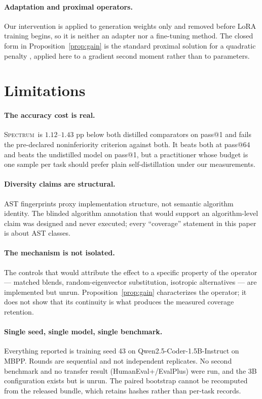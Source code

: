 \documentclass{article}
\newcommand{\method}{\textsc{Spectrum}}
\begin{document}
\paragraph{Adaptation and proximal operators.} Our intervention is applied to generation weights only and removed before LoRA \citep{hu2022lora} training begins, so it is neither an adapter nor a fine-tuning method. The closed form in Proposition~\ref{prop:gain} is the standard proximal solution for a quadratic penalty \citep{parikh2014proximal}, applied here to a gradient second moment rather than to parameters.

\section{Limitations}
\label{sec:limits}

\paragraph{The accuracy cost is real.} \method\ is $1.12$--$1.43$ pp below both distilled comparators on pass@1 and fails the pre-declared noninferiority criterion against both. It beats both at pass@$64$ and beats the undistilled model on pass@1, but a practitioner whose budget is one sample per task should prefer plain self-distillation under our measurements.

\paragraph{Diversity claims are structural.} AST fingerprints proxy implementation structure, not semantic algorithm identity. The blinded algorithm annotation that would support an algorithm-level claim was designed and never executed; every ``coverage'' statement in this paper is about AST classes.

\paragraph{The mechanism is not isolated.} The controls that would attribute the effect to a specific property of the operator --- matched blends, random-eigenvector substitution, isotropic alternatives --- are implemented but unrun. Proposition~\ref{prop:gain} characterizes the operator; it does not show that its continuity is what produces the measured coverage retention.

\paragraph{Single seed, single model, single benchmark.} Everything reported is training seed 43 on Qwen2.5-Coder-1.5B-Instruct on MBPP. Rounds are sequential and not independent replicates. No second benchmark and no transfer result (HumanEval+/EvalPlus) were run, and the 3B configuration exists but is unrun. The paired bootstrap cannot be recomputed from the released bundle, which retains hashes rather than per-task records.
\end{document}
